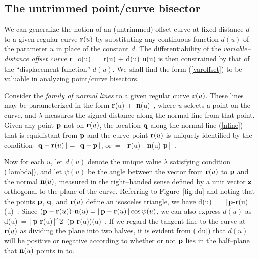 \subsection{The untrimmed point/curve bisector}
\label{sec:untrim}

We can generalize the notion of an (untrimmed) offset curve at fixed
distance $d$ to a given regular curve ${\bf r}(u)$ by substituting
any continuous function $d(u)$ of the parameter $u$ in place of the
constant $d$. The differentiability of the {\it variable--distance
offset curve}
\be \label{varoffset}
{\bf r}_o(u) \,=\, {\bf r}(u) + d(u) {\bf n}(u)
\ee
is then constrained by that of the ``displacement function'' $d(u)$.
We shall find the form (\ref{varoffset}) to be valuable in analyzing
point/curve bisectors.

Consider the {\it family of normal lines\/} to a given regular curve
${\bf r}(u)$. These lines may be parameterized in the form
\be \label{nline}
{\bf r}(u) + \lambda\,{\bf n}(u) \,,
\ee
where $u$ selects a point on the curve, and $\lambda$ measures the
signed distance along the normal line from that point. Given any point
${\bf p}$ not on ${\bf r}(u)$, the location ${\bf q}$ along the normal
line (\ref{nline}) that is equidistant from ${\bf p}$ and the curve
point ${\bf r}(u)$ is uniquely identified by the condition $|\,{\bf q}
-{\bf r}(u)\,|=|\,{\bf q}-{\bf p}\,|$, or
\be \label{lambda}
\lambda \,=\, |\,{\bf r}(u)+\lambda\,{\bf n}(u)-{\bf p}\,| \,.
\ee


Now for each $u$, let $d(u)$ denote the unique value $\lambda$
satisfying condition (\ref{lambda}), and let $\psi(u)$ be the angle
between the vector from ${\bf r}(u)$ to ${\bf p}$ and the normal
${\bf n}(u)$, measured in the right--handed sense defined by a unit
vector ${\bf z}$ orthogonal to the plane of the curve. Referring to
Figure~\ref{fig:du} and noting that the points ${\bf p}$, ${\bf q}$,
and ${\bf r}(u)$ define an isosceles triangle, we have
\be \label{du0}
d(u) \,=\, \half\,|\,{\bf p}-{\bf r}(u)\,|\sec\psi(u) \,.
\ee
Since $({\bf p}-{\bf r}(u))\!\cdot\!{\bf n}(u)=|\,{\bf p}-{\bf r}(u)\,|
\cos\psi(u)$, we can also express $d(u)$ as
\be \label{du}
d(u) \,=\, {|\,{\bf p}-{\bf r}(u)\,|^2 \,({\bf p}-{\bf r}(u))(u)} \,.
\ee
If we regard the tangent line to the curve at ${\bf r}(u)$ as dividing
the plane into two halves, it is evident from (\ref{du}) that $d(u)$
will be positive or negative according to whether or not ${\bf p}$
lies in the half--plane that ${\bf n}(u)$ points in to.

